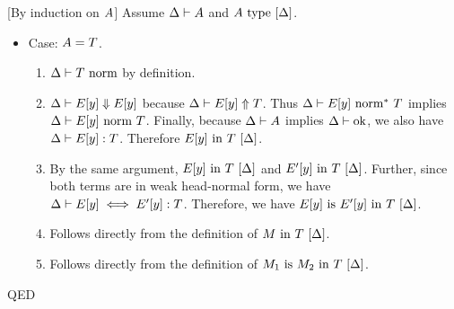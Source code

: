 \documentclass{article}
\newcommand{\qed}{\mbox{QED}}
\newenvironment{proof}{\noindent{\bf Proof:}\hspace*{0.5em}}{\hspace*{\fill}\qed}
\theoremstyle{break}
\begin{document}
\begin{proof}[By induction on $A$]
Assume $\Delta\vdash A$ and ${A}\mathrm{\ type\ }[\Delta]$.
\begin{itemize}
\item Case: $A = T$.
\begin{enumerate}
\item ${\Delta}\vdash{T}\mbox{\ norm}$ by definition.
\item $\Delta\vdash E[y] \Downarrow E[y]$ because
$\Delta\vdash E[y] \Uparrow T$.  Thus
${\Delta}\vdash{E[y]}\mbox{\ norm}^*\ {T}$ implies
${\Delta}\vdash{E[y]}\mbox{\ norm\ }{T}$.
Finally, because
$\Delta\vdash A$ implies ${\Delta}\vdash\mbox{ok}$, we also
have $\Delta\vdash E[y] : T$.  Therefore
${E[y]}\mathrm{\ in\ }{T}\ [\Delta]$.
\item By the same argument, ${E[y]}\mathrm{\ in\ }{T}\ [\Delta]$ and 
${E'[y]}\mathrm{\ in\ }{T}\ [\Delta]$. 
Further, since both terms are in weak head-normal form, we
have $\Delta\vdash E[y] \iff E'[y] : T$.
Therefore, we have
${E[y]}\mathrm{\ is\ }{E'[y]}\mathrm{\ in\ }{T}\ [\Delta]$.
\item Follows directly from the definition of 
${M}\mathrm{\ in\ }{T}\ [\Delta]$.
\item Follows directly from the definition of 
${M_1}\mathrm{\ is\ }{M_2}\mathrm{\ in\ }{T}\ [\Delta]$.
\end{enumerate}


\end{itemize}
\end{proof}
\end{document}
